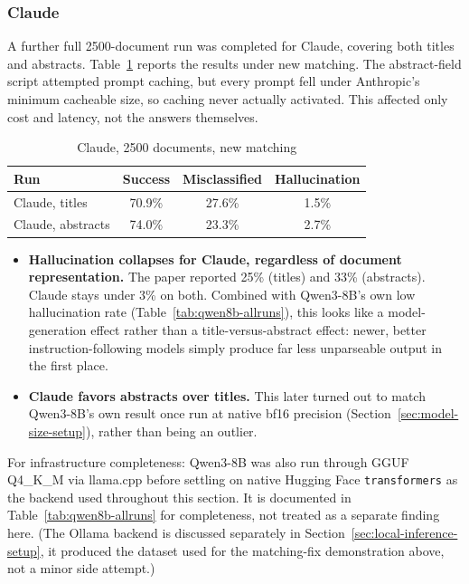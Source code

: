 \subsubsection{Claude}

A further full 2500-document run was completed for Claude, covering both titles and abstracts. Table~\ref{tab:claude-comparison} reports the results under new matching. The abstract-field script attempted prompt caching, but every prompt fell under Anthropic's minimum cacheable size, so caching never actually activated. This affected only cost and latency, not the answers themselves.

\begin{table}[h]
\centering
\caption{Claude, 2500 documents, new matching}
\label{tab:claude-comparison}
\begin{tabular}{lccc}
\toprule
Run & Success & Misclassified & Hallucination \\
\midrule
Claude, titles & 70.9\% & 27.6\% & 1.5\% \\
Claude, abstracts & 74.0\% & 23.3\% & 2.7\% \\
\bottomrule
\end{tabular}
\end{table}

\begin{itemize}
    \item \textbf{Hallucination collapses for Claude, regardless of document representation.} The paper reported 25\% (titles) and 33\% (abstracts). Claude stays under 3\% on both. Combined with Qwen3-8B's own low hallucination rate (Table~\ref{tab:qwen8b-allruns}), this looks like a model-generation effect rather than a title-versus-abstract effect: newer, better instruction-following models simply produce far less unparseable output in the first place.
    \item \textbf{Claude favors abstracts over titles.} This later turned out to match Qwen3-8B's own result once run at native bf16 precision (Section~\ref{sec:model-size-setup}), rather than being an outlier.
\end{itemize}

For infrastructure completeness: Qwen3-8B was also run through GGUF Q4\_K\_M via llama.cpp before settling on native Hugging Face \texttt{transformers} as the backend used throughout this section. It is documented in Table~\ref{tab:qwen8b-allruns} for completeness, not treated as a separate finding here. (The Ollama backend is discussed separately in Section~\ref{sec:local-inference-setup}, it produced the dataset used for the matching-fix demonstration above, not a minor side attempt.)

